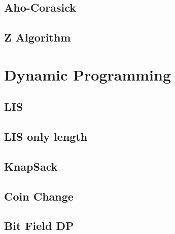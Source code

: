 \documentclass[10pt,landscape,a4paper,twocolumn]{article}
\begin{document}
\subsection{Aho-Corasick}


\subsection{Z Algorithm}


\section {Dynamic Programming}

\subsection{LIS}


\subsection{LIS only length}


\subsection{KnapSack}


\subsection{Coin Change}


\subsection{Bit Field DP}

\end{document}
